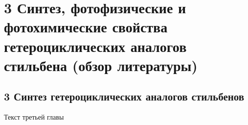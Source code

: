 \chapter{3 Синтез, фотофизические и фотохимические свойства гетероциклических аналогов стильбена (обзор литературы)} \label{chapt3}

	\section{3 Синтез гетероциклических аналогов стильбенов}\label{sect3_1}
	
		Текст третьей главы